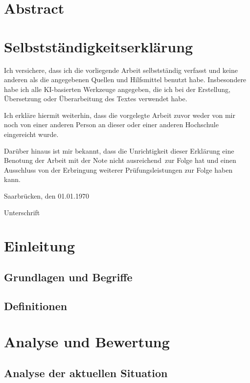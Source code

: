 \documentclass[paper=a4,fontsize=12pt,ngerman]{scrartcl}
\begin{document}
\pagestyle{plain}



\section*{Abstract}
 

\newpage
\section*{Selbstständigkeitserklärung}
Ich versichere, dass ich die vorliegende Arbeit selbstständig verfasst und 
keine anderen als die angegebenen Quellen und Hilfsmittel benutzt habe.
Insbesondere habe ich alle KI-basierten Werkzeuge angegeben, die ich bei
der Erstellung, Übersetzung oder Überarbeitung des Textes verwendet habe.

Ich erkläre hiermit weiterhin, dass die vorgelegte Arbeit zuvor weder von mir 
noch von einer anderen Person an dieser oder einer anderen Hochschule 
eingereicht wurde.

Darüber hinaus ist mir bekannt, dass die Unrichtigkeit dieser Erklärung eine 
Benotung der Arbeit mit der Note \glqq nicht ausreichend\grqq \ zur Folge hat 
und einen Ausschluss von der Erbringung weiterer Prüfungsleistungen zur Folge 
haben kann.
\bigskip
 
Saarbrücken, den 01.01.1970

\smallskip
Unterschrift




\clearpage
\tableofcontents 
\newpage

\section{Einleitung}
\subsection{Grundlagen und Begriffe}
\subsection{Definitionen}

\section{Analyse und Bewertung}
\subsection{Analyse der aktuellen Situation}
\end{document}
